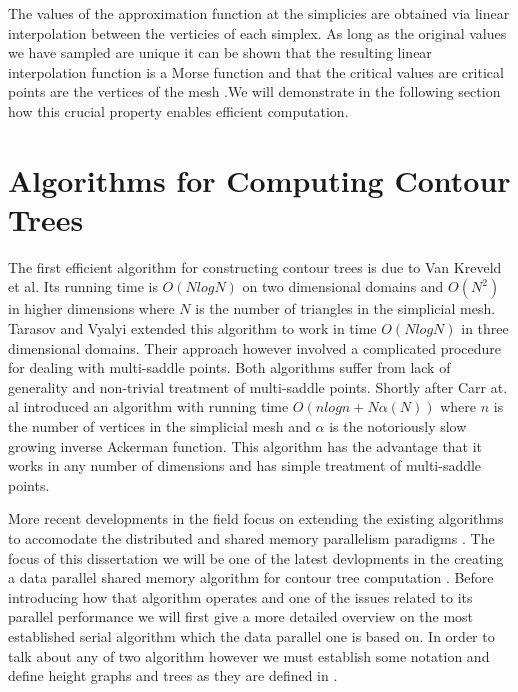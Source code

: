 The values of the approximation function at the simplicies are obtained via linear interpolation between the verticies of each simplex. As long as the original values we have sampled are unique it can be shown that the resulting linear interpolation function is a Morse function and that the critical values are critical points are the vertices of the mesh \cite{curvature-embeded-polyhedra}.We will demonstrate in the following section how this crucial property enables efficient computation.

\section{Algorithms for Computing Contour Trees}

The first efficient algorithm for constructing contour trees \cite{first-ct-algo} is due to Van Kreveld et al. Its running time is $O(NlogN)$ on two dimensional domains and $O(N^2)$ in higher dimensions where $N$ is the number of triangles in the simplicial mesh. Tarasov and Vyalyi \cite{second-ct-algo} extended this algorithm to work in time $O(NlogN)$ in three dimensional domains. Their approach however involved a complicated procedure for dealing with multi-saddle points. Both algorithms suffer from lack of generality and non-trivial treatment of multi-saddle points. Shortly after Carr at. al \cite{ct-big-paper} introduced an algorithm with running time $O(nlogn + N\alpha(N))$ where $n$ is the number of vertices in the simplicial mesh and $\alpha$ is the notoriously slow growing inverse Ackerman function. This algorithm has the advantage that it works in any number of dimensions and has simple treatment of multi-saddle points.

More recent developments in the field focus on extending the existing algorithms to accomodate the distributed \cite{distributed-ct-algo, distributed-ct-algo-2} and shared memory parallelism paradigms \cite{parallel-peak-pruning, parallel-ct-1}. The focus of this dissertation we will be one of the latest devlopments in the creating a data parallel shared memory algorithm for contour tree computation
\cite{parallel-peak-pruning}. Before introducing how that algorithm operates and one of the issues related to its parallel performance we will first give a more detailed overview on the most established serial algorithm \cite{ct-big-paper} which the data parallel one is based on. In order to talk about any of two algorithm however we must establish some notation and define height graphs and trees as they are defined in \cite{carr-masters}.

